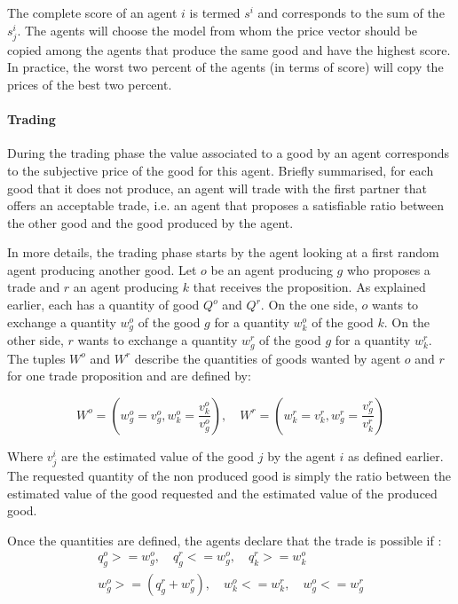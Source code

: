 \documentclass{wscpaperproc}
\begin{document}
The complete score of an agent $i$ is termed $s^i$ and corresponds to the sum of the $s^i_j$. The agents will choose the model from whom the price vector should be copied among the agents that produce the same good and have the highest score. In practice, the worst two percent of the agents (in terms of score) will copy the prices of the best two percent.


\paragraph{Trading} 
During the trading phase the value associated to a good by an agent corresponds to the subjective price of the good for this agent. Briefly summarised, for each good that it does not produce, an agent will trade with the first partner that offers an acceptable trade, i.e. an agent that proposes a satisfiable ratio between the other good and the good produced by the agent. 

In more details, the trading phase starts by the agent looking at a first random agent producing another good. 
Let $o$ be an agent producing $g$ who proposes a trade and $r$ an agent producing $k$ that receives the proposition. As explained earlier, each has a quantity of good $Q^o$ and $Q^r$. On the one side, $o$ wants to exchange a quantity $w_g^o$ of the good $g$ for a quantity $w_k^o$ of the good $k$. On the other side, $r$ wants to exchange a quantity $w_g^r$ of the good $g$ for a quantity $w_k^r$. The tuples $W^o$ and $W^r$ describe the quantities of goods wanted by agent $o$ and $r$ for one trade proposition and are defined by:  

\begin{equation}
	 W^o=(w_g^o = v_g^o,w_k^o= \frac{v_k^o}{v_g^o}), \quad
	 W^r=(w_k^r = v_k^r,w_g^r= \frac{v_g^r}{v_k^r}) 
	 \label{eq:trade}
\end{equation}

 Where $v_j^i$ are the estimated value of the good $j$ by the agent $i$ as defined earlier. 
The requested quantity of the non produced good is simply the ratio between the estimated value of the good requested and the estimated value of the produced good.


Once the quantities are defined, the agents declare that the trade is possible if :
\begin{align}
q_g^o >= w_g^o,\quad q_g^r <= w_g^o,\quad q_k^r >= w_k^o \label{eq:constraintQty}\\
w_g^o>=(q_g^r+w_g^r),\quad w_k^o<=w_k^r,\quad w_g^o<=w_g^r \label{eq:constraintWill}
\end{align}
\end{document}
